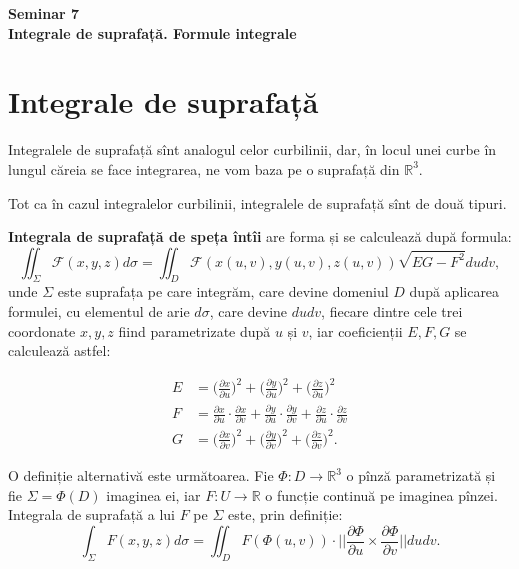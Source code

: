 \documentclass[11pt,a4paper]{article}
\newcommand\RR{\mathbb{R}}
\theoremstyle{dotless}
\theoremstyle{dotlessdr}
\begin{document}
\begin{center}
  {\large\textbf{Seminar 7 \\
      Integrale de suprafață. Formule integrale}}
\end{center}

\vspace{1cm}

\section{Integrale de suprafață}
\label{sec:teorie}

Integralele de suprafață sînt analogul celor curbilinii, dar, în locul unei curbe
în lungul căreia se face integrarea, ne vom baza pe o suprafață din $\RR^3$.

Tot ca în cazul integralelor curbilinii, integralele de suprafață sînt de două tipuri.

\textbf{Integrala de suprafață de speța întîi} are forma și se calculează după formula:
\[
  \iint_\Sigma \mathcal{F}(x, y, z) d\sigma =
  \iint_D \mathcal{F}(x(u,v), y(u,v), z(u,v)) \sqrt{EG - F^2} dudv,
\]
unde $\Sigma$ este suprafața pe care integrăm, care devine domeniul $D$ după aplicarea
formulei, cu elementul de arie $d \sigma$, care devine $dudv$, fiecare dintre cele trei
coordonate $x, y, z$ fiind parametrizate după $u$ și $v$, iar coeficienții $E, F, G$
se calculează astfel:

\begin{align*}
  E &= \Big( \frac{\partial x}{\partial u} \Big)^2 + \Big(\frac{\partial y}{\partial u}\Big)^2 +
      \Big(\frac{\partial z}{\partial u}\Big)^2 \\
  F &= \frac{\partial x}{\partial u} \cdot \frac{\partial x}{\partial v} +
      \frac{\partial y}{\partial u} \cdot \frac{\partial y}{\partial v} +
      \frac{\partial z}{\partial u} \cdot \frac{\partial z}{\partial v} \\
  G &= \Big(\frac{\partial x}{\partial v} \Big)^2 + \Big(\frac{\partial y}{\partial v}\Big)^2 +
      \Big(\frac{\partial z}{\partial v} \Big)^2.
\end{align*}

O definiție alternativă este următoarea. Fie $\Phi : D \to \RR^3$ o pînză parametrizată
și fie $\Sigma = \Phi(D)$ imaginea ei, iar $F : U \to \RR$ o funcție continuă pe
imaginea pînzei. Integrala de suprafață a lui $F$ pe $\Sigma$ este, prin definiție:
\[
  \int_\Sigma F(x, y, z) d \sigma =
  \iint_D F(\Phi(u, v)) \cdot \Big|\Big| \frac{\partial \Phi}{\partial u} \times %
  \frac{\partial \Phi}{\partial v} \Big|\Big| dudv.
\]
\end{document}
